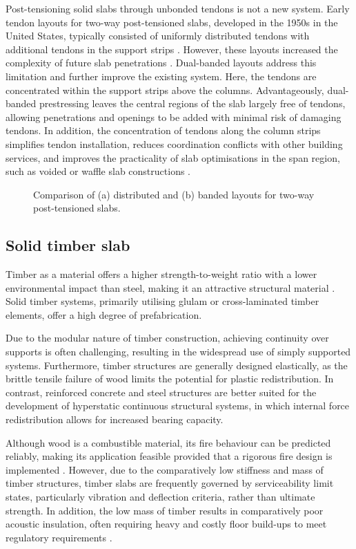 Post-tensioning solid slabs through unbonded tendons is not a new system. Early tendon layouts for two-way post-tensioned slabs, developed in the 1950s in the United States, typically consisted of uniformly distributed tendons with additional tendons in the support strips \cite{PTI2023}. However, these layouts increased the complexity of future slab penetrations \cite{Rombach2010}. Dual-banded layouts address this limitation and further improve the existing system. Here, the tendons are concentrated within the support strips above the columns. Advantageously, dual-banded prestressing leaves the central regions of the slab largely free of tendons, allowing penetrations and openings to be added with minimal risk of damaging tendons. In addition, the concentration of tendons along the column strips simplifies tendon installation, reduces coordination conflicts with other building services, and improves the practicality of slab optimisations in the span region, such as voided or waffle slab constructions \cite{PTI2023}.

\begin{figure}[htbp]
    \centering
    \resizebox{\textwidth}{!}{%
        
    }
    \caption{Comparison of (a) distributed and (b) banded layouts for two-way post-tensioned slabs.}
    \label{fig:distributed_banded_tendon_layouts}
\end{figure}


\subsection{Solid timber slab}
Timber as a material offers a higher strength-to-weight ratio with a lower environmental impact than steel, making it an attractive structural material \cite{Wimmers2017}. Solid timber systems, primarily utilising glulam or cross-laminated timber elements, offer a high degree of prefabrication.

Due to the modular nature of timber construction, achieving continuity over supports is often challenging, resulting in the widespread use of simply supported systems. Furthermore, timber structures are generally designed elastically, as the brittle tensile failure of wood limits the potential for plastic redistribution. In contrast, reinforced concrete and steel structures are better suited for the development of hyperstatic continuous structural systems, in which internal force redistribution allows for increased bearing capacity.

Although wood is a combustible material, its fire behaviour can be predicted reliably, making its application feasible provided that a rigorous fire design is implemented \cite{frangi2008fire}. However, due to the comparatively low stiffness and mass of timber structures, timber slabs are frequently governed by serviceability limit states, particularly vibration and deflection criteria, rather than ultimate strength. In addition, the low mass of timber results in comparatively poor acoustic insulation, often requiring heavy and costly floor build-ups to meet regulatory requirements \cite{Kaufmann2024_WhitePaper}.


